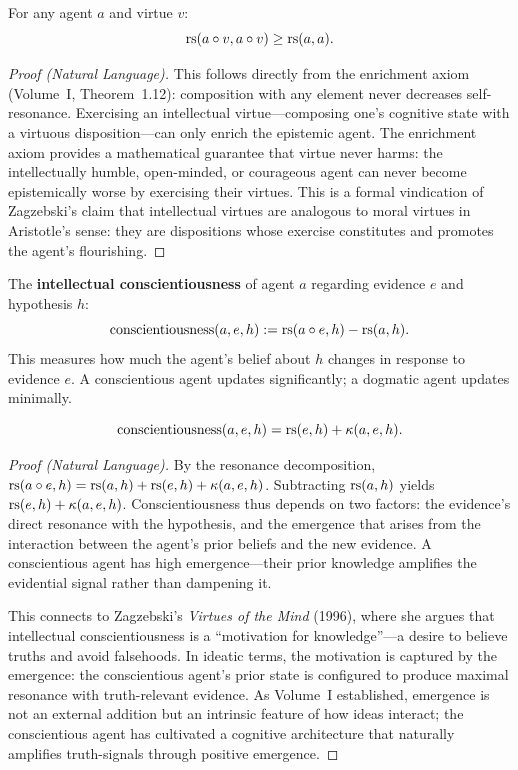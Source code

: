 \begin{theorem}
\label{thm:virtuous-enriches}
For any agent $a$ and virtue $v$:
\[
  \mathrm{rs}(a \circ v, a \circ v) \geq \mathrm{rs}(a, a).
\]
\end{theorem}

\begin{proof}[Proof (Natural Language)]
This follows directly from the enrichment axiom (Volume~I, Theorem~1.12):
composition with any element never decreases self-resonance. Exercising an
intellectual virtue---composing one's cognitive state with a virtuous disposition---can
only enrich the epistemic agent. The enrichment axiom provides a mathematical
guarantee that virtue never harms: the intellectually humble, open-minded, or
courageous agent can never become epistemically worse by exercising their virtues.
This is a formal vindication of Zagzebski's claim that intellectual virtues are
analogous to moral virtues in Aristotle's sense: they are dispositions whose
exercise constitutes and promotes the agent's flourishing.
\end{proof}

\begin{definition}
\label{def:conscientiousness}
The \textbf{intellectual conscientiousness} of agent $a$ regarding evidence $e$ and
hypothesis $h$:
\[
  \mathrm{conscientiousness}(a, e, h) := \mathrm{rs}(a \circ e, h) - \mathrm{rs}(a, h).
\]
This measures how much the agent's belief about $h$ changes in response to evidence $e$.
A conscientious agent updates significantly; a dogmatic agent updates minimally.
\end{definition}

\begin{theorem}
\label{thm:conscientiousness-decomp}
\[
  \mathrm{conscientiousness}(a, e, h) = \mathrm{rs}(e, h) + \kappa(a, e, h).
\]
\end{theorem}

\begin{proof}[Proof (Natural Language)]
By the resonance decomposition, $\mathrm{rs}(a \circ e, h) = \mathrm{rs}(a, h) + \mathrm{rs}(e, h) +
\kappa(a, e, h)$. Subtracting $\mathrm{rs}(a, h)$ yields $\mathrm{rs}(e, h) + \kappa(a, e, h)$.
Conscientiousness thus depends on two factors: the evidence's direct resonance with
the hypothesis, and the emergence that arises from the interaction between the agent's
prior beliefs and the new evidence. A conscientious agent has high emergence---their
prior knowledge amplifies the evidential signal rather than dampening it.

This connects to Zagzebski's \emph{Virtues of the Mind} (1996), where she argues
that intellectual conscientiousness is a ``motivation for knowledge''---a desire
to believe truths and avoid falsehoods. In ideatic terms, the motivation is
captured by the emergence: the conscientious agent's prior state is configured
to produce maximal resonance with truth-relevant evidence. As Volume~I established,
emergence is not an external addition but an intrinsic feature of how ideas interact;
the conscientious agent has cultivated a cognitive architecture that naturally
amplifies truth-signals through positive emergence.
\end{proof}

